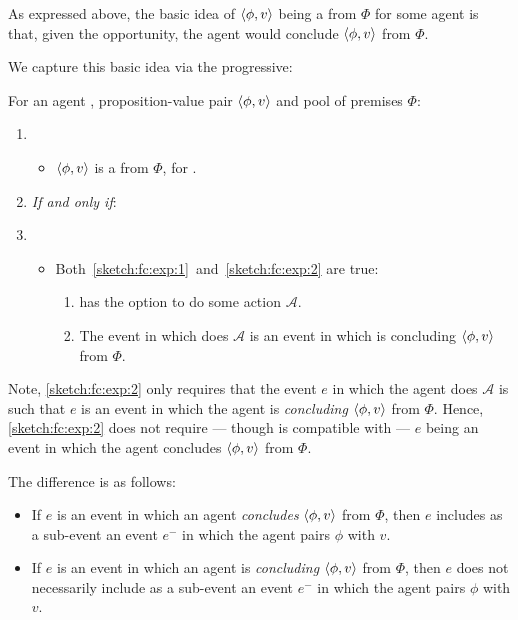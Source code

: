 \begin{note}
  As expressed above, the basic idea of \(\langle \phi, v \rangle\) being a \fc{} from \(\Phi\) for some agent is that, given the opportunity, the agent would conclude \(\langle \phi, v \rangle\) from \(\Phi\).

  We capture this basic idea via the progressive:

  \begin{sketch}[\fc{3}]
    For an agent \vAgent{}, proposition-value pair \(\langle \phi, v \rangle\) and pool of premises \(\Phi\):

    \begin{enumerate}[label=]
    \item
      \begin{itemize}
      \item
        \(\langle \phi, v \rangle\) is a \emph{} from \(\Phi\), for \vAgent{}.
      \end{itemize}
    \item
      \emph{If and only if}:
    \item
      \begin{itemize}
      \item
        Both~\ref{sketch:fc:exp:1}~and~\ref{sketch:fc:exp:2} are true:
        \begin{enumerate}[label=\alph*., ref=(\alph*)]
        \item
          \label{sketch:fc:exp:1}
          \vAgent{} has the option to do some action \(\mathcal{A}\).
        \item
          \label{sketch:fc:exp:2}
          The event in which \vAgent{} does \(\mathcal{A}\) is an event in which \vAgent{} is concluding \(\langle \phi, v \rangle\) from \(\Phi\).
        \end{enumerate}
      \end{itemize}
    \end{enumerate}
    \vspace{-\baselineskip}
  \end{sketch}

  Note, \ref{sketch:fc:exp:2} only requires that the event \(e\) in which the agent does \(\mathcal{A}\) is such that \(e\) is an event in which the agent is \emph{concluding} \(\langle \phi, v \rangle\) from \(\Phi\).
  Hence, \ref{sketch:fc:exp:2} does not require --- though is compatible with --- \(e\) being an event in which the agent concludes \(\langle \phi, v \rangle\) from \(\Phi\).

  The difference is as follows:
  \begin{itemize}
  \item
    If \(e\) is an event in which an agent \emph{concludes} \(\langle \phi, v \rangle\) from \(\Phi\), then \(e\) includes as a sub-event an event \(e^{-}\) in which the agent pairs \(\phi\) with \(v\).
  \item
    If \(e\) is an event in which an agent is \emph{concluding} \(\langle \phi, v \rangle\) from \(\Phi\), then \(e\) does not necessarily include as a sub-event an event \(e^{-}\) in which the agent pairs \(\phi\) with \(v\).


\end{itemize}
\end{note}

